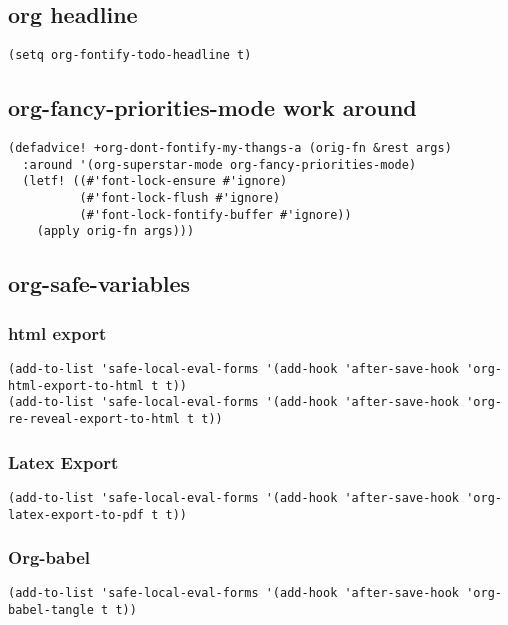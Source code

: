 \documentclass{assignments}
\begin{document}
\subsection*{org headline}
\label{sec:org81731c2}
\begin{verbatim}
(setq org-fontify-todo-headline t)
\end{verbatim}
\subsection*{org-fancy-priorities-mode work around}
\label{sec:orge0906fd}
\begin{verbatim}
(defadvice! +org-dont-fontify-my-thangs-a (orig-fn &rest args)
  :around '(org-superstar-mode org-fancy-priorities-mode)
  (letf! ((#'font-lock-ensure #'ignore)
          (#'font-lock-flush #'ignore)
          (#'font-lock-fontify-buffer #'ignore))
    (apply orig-fn args)))
\end{verbatim}
\subsection*{org-safe-variables}
\label{sec:orgb435381}
\subsubsection*{html export}
\label{sec:org5c8e1ae}
\begin{verbatim}
(add-to-list 'safe-local-eval-forms '(add-hook 'after-save-hook 'org-html-export-to-html t t))
(add-to-list 'safe-local-eval-forms '(add-hook 'after-save-hook 'org-re-reveal-export-to-html t t))
\end{verbatim}
\subsubsection*{Latex Export}
\label{sec:org194d912}
\begin{verbatim}
(add-to-list 'safe-local-eval-forms '(add-hook 'after-save-hook 'org-latex-export-to-pdf t t))
\end{verbatim}
\subsubsection*{Org-babel}
\label{sec:orgfb70850}
\begin{verbatim}
(add-to-list 'safe-local-eval-forms '(add-hook 'after-save-hook 'org-babel-tangle t t))
\end{verbatim}
\end{document}
